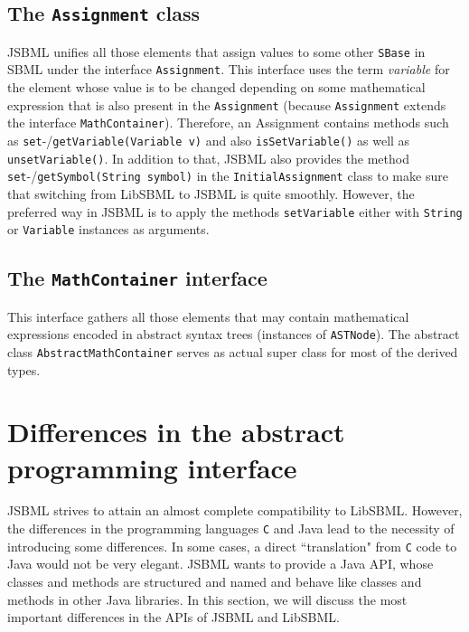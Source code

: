 \documentclass[
  BCOR12mm,
  letterpaper,
  11pt,
  headsepline,
  pointlessnumbers,
  tablecaptionabove,
  onelinecaption,
  headinclude,
  appendixprefix,
  idxtotoc,
  bibtotoc,
  twoside,
  titlepage
]{scrartcl}
\begin{document}
\subsection{The \texttt{Assignment} class}

JSBML unifies all those elements that assign values to some other
\texttt{SBase} in SBML \citep{M.Hucka03012003} under the interface \texttt{Assignment}. This interface
uses the term \emph{variable} for the element whose value is to be changed depending on some mathematical expression that is also present in the \texttt{Assignment}
(because \texttt{Assignment} extends the interface \texttt{MathContainer}). Therefore,
an Assignment contains methods such as \texttt{set}-/\texttt{getVariable(Variable v)} and also \texttt{isSetVariable()} as well as
\texttt{unsetVariable()}. In addition to that, JSBML also provides the method \texttt{set}-/\texttt{getSymbol(String symbol)} in the \texttt{InitialAssignment}
class to make sure that switching from LibSBML to JSBML is quite smoothly.
However, the preferred way in JSBML is to apply the methods
\texttt{setVariable} either with \texttt{String} or \texttt{Variable} instances as arguments.

\subsection{The \texttt{MathContainer} interface}

This interface gathers all those elements that may contain mathematical
expressions encoded in abstract syntax trees (instances of \texttt{ASTNode}).
The abstract class \texttt{AbstractMathContainer} serves as actual super class
for most of the derived types.


\section{Differences in the abstract programming interface}

JSBML strives to attain an almost complete compatibility to LibSBML. However,
the differences in the programming languages \texttt{C} and Java\texttrademark{}
lead to the necessity of introducing some differences. In some cases, a direct
``translation" from \texttt{C} code to Java would not be very elegant. JSBML
wants to provide a Java API, whose classes and methods are structured and named
and behave like classes and methods in other Java libraries. In this section, we
will discuss the most important differences in the APIs of JSBML and LibSBML.
\end{document}
